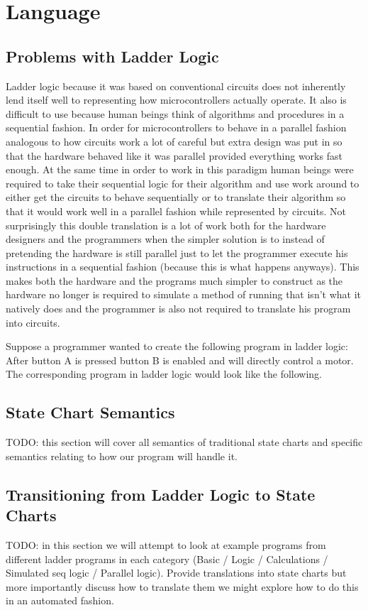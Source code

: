 \chapter{Language}
\section{Problems with Ladder Logic}
Ladder logic because it was based on conventional circuits does not inherently lend itself well to representing how microcontrollers actually operate. It also is difficult to use because human beings think of algorithms and procedures in a sequential fashion. In order for microcontrollers to behave in a parallel fashion analogous to how circuits work a lot of careful but extra design was put in so that the hardware behaved like it was parallel provided everything works fast enough. At the same time in order to work in this paradigm human beings were required to take their sequential logic for their algorithm and use work around to either get the circuits to behave sequentially or to translate their algorithm so that it would work well in a parallel fashion while represented by circuits. Not surprisingly this double translation is a lot of work both for the hardware designers and the programmers when the simpler solution is to instead of pretending the hardware is still parallel just to let the programmer execute his instructions in a sequential fashion (because this is what happens anyways). This makes both the hardware and the programs much simpler to construct as the hardware no longer is required to simulate a method of running that isn't what it natively does and the programmer is also not required to translate his program into circuits.

Suppose a programmer wanted to create the following program in ladder logic: After button A is pressed button B is enabled and will directly control a motor. The corresponding program in ladder logic would look like the following.


\section{State Chart Semantics}\label{sec:lang:statesemantics}
TODO: this section will cover all semantics of traditional state charts and specific semantics relating to how our program will handle it.
\section{Transitioning from Ladder Logic to State Charts}
TODO: in this section we will attempt to look at example programs from different ladder programs in each category (Basic / Logic / Calculations / Simulated seq logic / Parallel logic). Provide translations into state charts but more importantly discuss how to translate them we might explore how to do this in an automated fashion.
